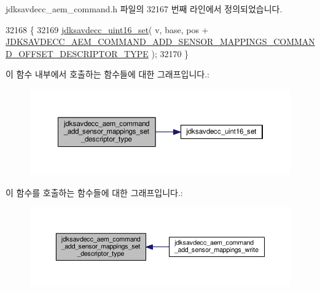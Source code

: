 jdksavdecc\+\_\+aem\+\_\+command.\+h 파일의 32167 번째 라인에서 정의되었습니다.


\begin{DoxyCode}
32168 \{
32169     \hyperlink{group__endian_ga14b9eeadc05f94334096c127c955a60b}{jdksavdecc\_uint16\_set}( v, base, pos + 
      \hyperlink{group__command__add__sensor__mappings_ga14bc603f9eb0a6055b75c102bdfadd3d}{JDKSAVDECC\_AEM\_COMMAND\_ADD\_SENSOR\_MAPPINGS\_COMMAND\_OFFSET\_DESCRIPTOR\_TYPE}
       );
32170 \}
\end{DoxyCode}


이 함수 내부에서 호출하는 함수들에 대한 그래프입니다.\+:
\nopagebreak
\begin{figure}[H]
\begin{center}
\leavevmode
\includegraphics[width=350pt]{group__command__add__sensor__mappings_gaf60ec191c32be65a7dcbc286ec48cc77_cgraph}
\end{center}
\end{figure}




이 함수를 호출하는 함수들에 대한 그래프입니다.\+:
\nopagebreak
\begin{figure}[H]
\begin{center}
\leavevmode
\includegraphics[width=350pt]{group__command__add__sensor__mappings_gaf60ec191c32be65a7dcbc286ec48cc77_icgraph}
\end{center}
\end{figure}



